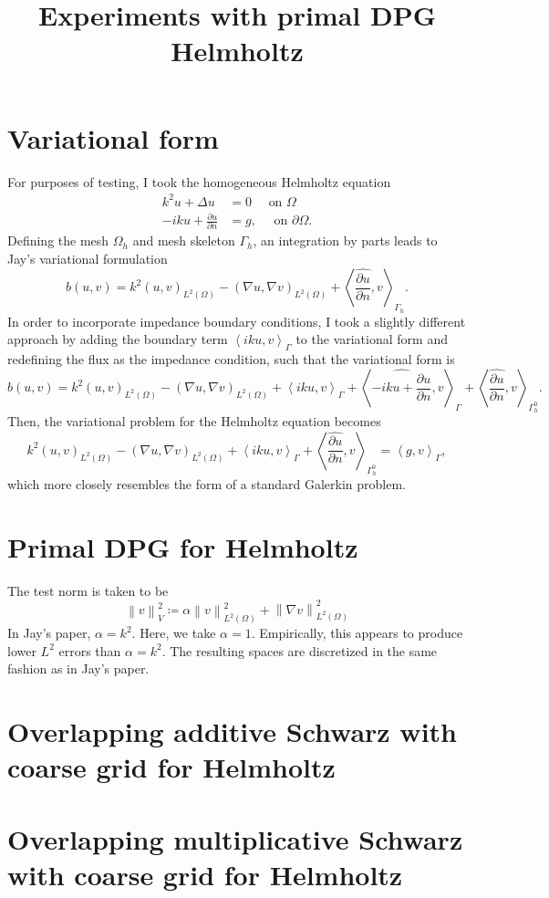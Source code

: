 \documentclass{article}
\title{Experiments with primal DPG Helmholtz}
\newcommand{\grad}{\nabla}
\newcommand{\pd}[2]{\frac{\partial#1}{\partial#2}}
\newcommand{\nor}[1]{\left\| #1 \right\|}
\newcommand{\LRp}[1]{\left( #1 \right)}
\newcommand{\LRa}[1]{\left\langle #1 \right\rangle}
\renewcommand{\L}{L^2\LRp{\Omega}}
\begin{document}
\section{Variational form}
For purposes of testing, I took the homogeneous Helmholtz equation
\begin{align*}
k^2 u + \Delta u &= 0 \quad \text{ on } \Omega\\
-iku + \pd{u}{n} &= g, \quad \text{ on } \partial\Omega.
\end{align*}
Defining the mesh $\Omega_h$ and mesh skeleton $\Gamma_h$, an integration by parts leads to Jay's variational formulation 
\[
b(u,v) = k^2\LRp{u,v}_{\L} - \LRp{\grad u,\grad v}_{\L} + \LRa{\widehat{\pd{u}{n}},v}_{\Gamma_h}.
\]
In order to incorporate impedance boundary conditions, I took a slightly different approach by adding the boundary term $\LRa{iku,v}_{\Gamma}$ to the variational form and redefining the flux as the impedance condition, such that the variational form is
\[
b(u,v) = k^2\LRp{u,v}_{\L} - \LRp{\grad u,\grad v}_{\L} + \LRa{iku,v}_{\Gamma}+ \LRa{\widehat{-iku + \pd{u}{n}},v}_{\Gamma} + \LRa{\widehat{\pd{u}{n}},v}_{\Gamma_h^0}.
\]
Then, the variational problem for the Helmholtz equation becomes
\[
k^2\LRp{u,v}_{\L} - \LRp{\grad u,\grad v}_{\L} + \LRa{iku,v}_{\Gamma}+ \LRa{\widehat{\pd{u}{n}},v}_{\Gamma_h^0} = \LRa{g,v}_{\Gamma},
\]
which more closely resembles the form of a standard Galerkin problem.  
\section{Primal DPG for Helmholtz}
The test norm is taken to be 
\[
\nor{v}^2_V \coloneqq \alpha\nor{v}_{\L}^2 + \nor{\grad v}_{\L}^2
\]
In Jay's paper, $\alpha = k^2$.  Here, we take $\alpha = 1$.  Empirically, this appears to produce lower $L^2$ errors than $\alpha = k^2$.  The resulting spaces are discretized in the same fashion as in Jay's paper.  

\section{Overlapping additive Schwarz with coarse grid for Helmholtz}



\section{Overlapping multiplicative Schwarz with coarse grid for Helmholtz}
\end{document}
